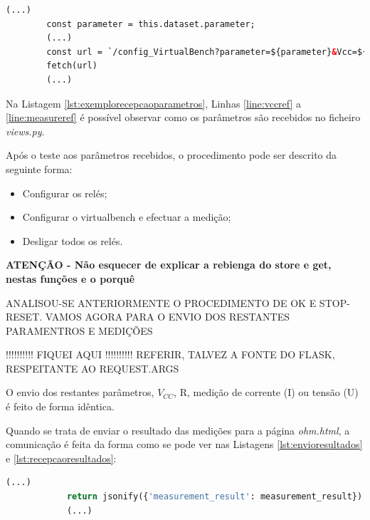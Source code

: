 \begin{minipage}{0.9\linewidth}
	\begin{lstlisting}[language=html, escapechar=|, caption=Envio de parâmetros da página \textit{ohm.html} para \textit{views.py}, label=lst:envioparmedidas]
		(...)
		const parameter = this.dataset.parameter;
		(...)
		const url = `/config_VirtualBench?parameter=${parameter}&Vcc=${Vcc}&R=${Resistance}`;
        fetch(url)
		(...)
	\end{lstlisting}
\end{minipage}

Na Listagem \ref{lst:exemplorecepcaoparametros}, Linhas \ref{line:vccref} a \ref{line:measureref} é possível observar como os parâmetros são recebidos no ficheiro \textit{views.py}.

Após o teste aos parâmetros recebidos, o procedimento pode ser descrito da seguinte forma:
\begin{itemize}
	\item Configurar os relés;
	\item Configurar o \acrshort{virtualbench} e efectuar a medição;
	\item Desligar todos os relés.
\end{itemize}

\textbf{ATENÇÃO - Não esquecer de explicar a rebienga do store e get, nestas funções e o porquê}

\vspace{1cm}

ANALISOU-SE ANTERIORMENTE O PROCEDIMENTO DE OK E STOP-RESET. VAMOS AGORA PARA O ENVIO DOS RESTANTES PARAMENTROS E MEDIÇÕES

!!!!!!!!!! FIQUEI AQUI !!!!!!!!!!
REFERIR, TALVEZ A FONTE DO FLASK, RESPEITANTE AO REQUEST.ARGS

O envio dos restantes parâmetros, $V_{CC}$, R, medição de corrente (I) ou tensão (U) é feito de forma idêntica.

Quando se trata de enviar o resultado das medições para a página \textit{ohm.html}, a comunicação é feita da forma como se pode ver nas Listagens \ref{lst:envioresultados} e \ref{lst:recepcaoresultados}:
\begin{center}
	\begin{minipage}{0.7\linewidth}
		\begin{lstlisting}[language=python, caption=Envio de resultados do servidor (\textit{views.py}) para a página \textit{ohm.html}, label=lst:envioresultados]
			(...)
			return jsonify({'measurement_result': measurement_result})
			(...)
	\end{lstlisting}
	\end{minipage}
\end{center}

